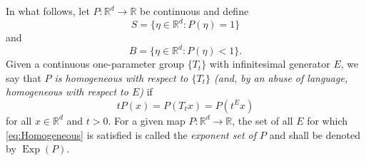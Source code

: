 \documentclass[11pt]{article}
\theoremstyle{theorem}
\newcommand\Exp{\operatorname{Exp}}
\begin{document}
\noindent In what follows, let $P:\mathbb{R}^d\to\mathbb{R}$ be continuous and define
\begin{equation}
S=\{\eta\in\mathbb{R}^d:P(\eta)=1\}
\end{equation}
and
\begin{equation*}
B=\{\eta\in\mathbb{R}^d:P(\eta)<1\}.
\end{equation*}
Given a continuous one-parameter group $\{T_t\}$ with infinitesimal generator $E$, we say that \textit{$P$ is homogeneous with respect to $\{T_t\}$ (and, by an abuse of language, homogeneous with respect to $E$)} if
\begin{equation}\label{eq:Homogeneous}
tP(x)=P(T_tx)=P\left(t^Ex\right)
\end{equation}
for all $x\in\mathbb{R}^d$ and $t>0$. For a given map $P:\mathbb{R}^d\to\mathbb{R}$, the set of all $E$ for which \eqref{eq:Homogeneous} is satisfied is called the \textit{exponent set of $P$} and shall be denoted by $\Exp(P)$. 
\end{document}
